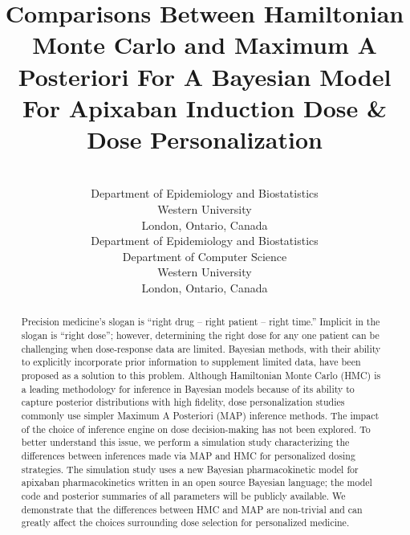 \documentclass[pmlr]{jmlr}%
\title[Comparisons Between HMC and MAP For Precision Medicine]{Comparisons Between Hamiltonian Monte Carlo and Maximum A Posteriori For A Bayesian Model For Apixaban Induction Dose \& Dose Personalization}
\author{\Name{A. Demetri Pananos}
       \Email{apananos@uwo.ca}\\ 
       \addr Department of Epidemiology and Biostatistics\\
       Western University\\
		London, Ontario, Canada
       \AND
       \Name{Daniel J. Lizotte}
       \Email{dlizotte@uwo.ca}\\ 
       \addr Department of Epidemiology and Biostatistics\\
       Department of Computer Science\\
       Western University\\
       London, Ontario, Canada}
\begin{document}
\maketitle

\begin{abstract}
Precision medicine’s slogan is “right drug -- right patient -- right time.” Implicit in the slogan is ``right dose''; however, determining the right dose for any one patient can be challenging when dose-response data are limited. Bayesian methods, with their ability to explicitly incorporate prior information to supplement limited data, have been proposed as a solution to this problem. Although Hamiltonian Monte Carlo (HMC) is a leading methodology for inference in Bayesian models because of its ability to capture posterior distributions with high fidelity, dose personalization studies commonly use simpler Maximum A Posteriori (MAP) inference methods. The impact of the choice of inference engine on dose decision-making has not been explored.   To better understand this issue, we perform a simulation study characterizing the differences between inferences made via MAP and HMC for personalized dosing strategies. The simulation study uses a new Bayesian pharmacokinetic model for apixaban pharmacokinetics written in an open source Bayesian language; the model code and posterior summaries of all parameters will be publicly available. We demonstrate that the differences between HMC and MAP are non-trivial and can greatly affect the choices surrounding dose selection for personalized medicine.

\end{abstract}









\newpage


\end{document}
